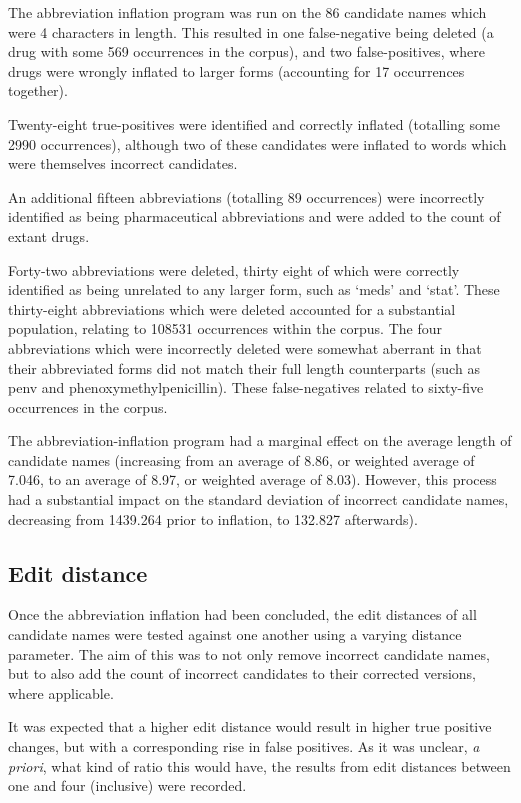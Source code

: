 The abbreviation inflation program was run on the 86 candidate names which were 4 characters in length. This resulted in one false-negative being deleted (a drug with some 569 occurrences in the corpus), and two false-positives, where drugs were wrongly inflated to larger forms (accounting for 17 occurrences together). 

Twenty-eight true-positives were identified and correctly inflated (totalling some 2990 occurrences), although two of these candidates were inflated to words which were themselves incorrect candidates.%

An additional fifteen abbreviations (totalling 89 occurrences) were incorrectly identified as being pharmaceutical abbreviations and were added to the count of extant drugs.

Forty-two abbreviations were deleted, thirty eight of which were correctly identified as being unrelated to any larger form, such as `meds' and `stat'. These thirty-eight abbreviations which were deleted accounted for a substantial population, relating to 108531 occurrences within the corpus. The four abbreviations which were incorrectly deleted were somewhat aberrant in that their abbreviated forms did not match their full length counterparts (such as penv and phenoxymethylpenicillin). These false-negatives related to sixty-five occurrences in the corpus.

The abbreviation-inflation program had a marginal effect on the average length of candidate names (increasing from an average of 8.86, or weighted average of 7.046, to an average of 8.97, or weighted average of 8.03). However, this process had a substantial impact on the standard deviation of incorrect candidate names, decreasing from 1439.264 prior to inflation, to 132.827 afterwards).

\subsection{Edit distance}

Once the abbreviation inflation had been concluded, the edit distances of all candidate names were tested against one another using a varying distance parameter. The aim of this was to not only remove incorrect candidate names, but to also add the count of incorrect candidates to their corrected versions, where applicable. 

It was expected that a higher edit distance would result in higher true positive changes, but with a corresponding rise in false positives. As it was unclear, \textit{a priori}, what kind of ratio this would have, the results from edit distances between one and four (inclusive) were recorded. 

